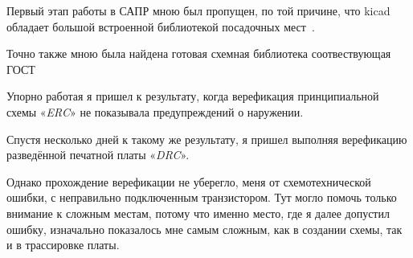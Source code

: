 Первый этап работы в САПР мною был пропущен,
по той причине, что kicad обладает большой встроенной
библиотекой посадочных мест~\cite{KiCAD-included-footprints}.

Точно также мною была найдена готовая
схемная библиотека соотвествующая ГОСТ ~\cite{KiCAD-symbols-gost}

Упорно работая я пришел к результату,
когда верефикация принципиальной схемы «\textit{ERC}»
не показывала предупреждений о наружении.

Спустя несколько дней к такому же результату,
я пришел выполняя верефикацию разведённой печатной платы «\textit{DRC}».

Однако прохождение верефикации не уберегло,
меня от схемотехнической ошибки,
с неправильно подключенным транзистором.
Тут могло помочь только внимание к сложным местам,
потому что именно место, где я далее допустил ошибку,
изначально показалось мне самым сложным, как в создании схемы,
так и в трассировке платы.

\newpage
